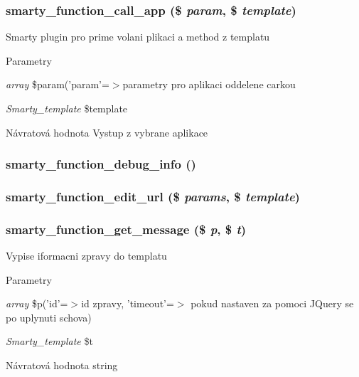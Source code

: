 \subsubsection[{smarty\_\-function\_\-call\_\-app}]{\setlength{\rightskip}{0pt plus 5cm}smarty\_\-function\_\-call\_\-app (\$ {\em param}, \/  \$ {\em template})}\label{d1/d0e/render_8php_a5a56657aec41317d4328a37c59c1d574}
Smarty plugin pro prime volani plikaci a method z templatu 
\begin{DoxyParams}{Parametry}
\item[{\em array}]\$param('param'=$>$parametry pro aplikaci oddelene carkou \item[{\em Smarty\_\-template}]\$template \end{DoxyParams}
\begin{DoxyReturn}{Návratová hodnota}
Vystup z vybrane aplikace 
\end{DoxyReturn}
\subsubsection[{smarty\_\-function\_\-debug\_\-info}]{\setlength{\rightskip}{0pt plus 5cm}smarty\_\-function\_\-debug\_\-info ()}\label{d1/d0e/render_8php_a209a8714d4750135017fa6b41b4d232b}
\subsubsection[{smarty\_\-function\_\-edit\_\-url}]{\setlength{\rightskip}{0pt plus 5cm}smarty\_\-function\_\-edit\_\-url (\$ {\em params}, \/  \$ {\em template})}\label{d1/d0e/render_8php_a2929fff7f695bfbbf99a08cf52c07745}
\subsubsection[{smarty\_\-function\_\-get\_\-message}]{\setlength{\rightskip}{0pt plus 5cm}smarty\_\-function\_\-get\_\-message (\$ {\em p}, \/  \$ {\em t})}\label{d1/d0e/render_8php_ad209079248b09e2f96fa83c1427c9a90}
Vypise iformacni zpravy do templatu 
\begin{DoxyParams}{Parametry}
\item[{\em array}]\$p('id'=$>$id zpravy, 'timeout'=$>$ pokud nastaven za pomoci JQuery se po uplynuti schova) \item[{\em Smarty\_\-template}]\$t \end{DoxyParams}
\begin{DoxyReturn}{Návratová hodnota}
string 
\end{DoxyReturn}

